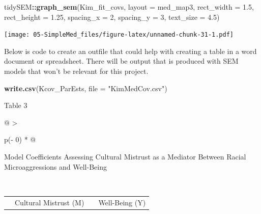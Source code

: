 \documentclass[
  11pt,
]{book}
\newenvironment{Shaded}{\begin{snugshade}}{\end{snugshade}}
\newcommand{\AttributeTok}[1]{\textcolor[rgb]{0.27,0.27,0.27}{#1}}
\newcommand{\DecValTok}[1]{\textcolor[rgb]{0.06,0.06,0.06}{#1}}
\newcommand{\FloatTok}[1]{\textcolor[rgb]{0.06,0.06,0.06}{#1}}
\newcommand{\FunctionTok}[1]{\textcolor[rgb]{0.27,0.27,0.27}{\textbf{#1}}}
\newcommand{\NormalTok}[1]{#1}
\newcommand{\SpecialCharTok}[1]{\textcolor[rgb]{0.43,0.43,0.43}{\textbf{#1}}}
\newcommand{\StringTok}[1]{\textcolor[rgb]{0.5,0.5,0.5}{#1}}
\begin{document}
\begin{Shaded}
\begin{Highlighting}[]
\NormalTok{tidySEM}\SpecialCharTok{::}\FunctionTok{graph\_sem}\NormalTok{(Kim\_fit\_covs, }\AttributeTok{layout =}\NormalTok{ med\_map3, }\AttributeTok{rect\_width =} \FloatTok{1.5}\NormalTok{, }\AttributeTok{rect\_height =} \FloatTok{1.25}\NormalTok{,}
    \AttributeTok{spacing\_x =} \DecValTok{2}\NormalTok{, }\AttributeTok{spacing\_y =} \DecValTok{3}\NormalTok{, }\AttributeTok{text\_size =} \FloatTok{4.5}\NormalTok{)}
\end{Highlighting}
\end{Shaded}

\texttt{[image: 05-SimpleMed\_files/figure-latex/unnamed-chunk-31-1.pdf]}

Below is code to create an outfile that could help with creating a table in a word document or spreadsheet. There will be output that is produced with SEM models that won't be relevant for this project.

\begin{Shaded}
\begin{Highlighting}[]
\FunctionTok{write.csv}\NormalTok{(Kcov\_ParEsts, }\AttributeTok{file =} \StringTok{"KimMedCov.csv"}\NormalTok{)}
\end{Highlighting}
\end{Shaded}

Table 3

\begin{longtable}[]{@{}
  >{\raggedright\arraybackslash}p{(\columnwidth - 0\tabcolsep) * }@{}}
\toprule\noalign{}
\begin{minipage}[b]{\linewidth}\raggedright
Model Coefficients Assessing Cultural Mistrust as a Mediator Between Racial Microaggressions and Well-Being
\end{minipage} \\
\midrule\noalign{}
\endhead
\bottomrule\noalign{}
\endlastfoot
\end{longtable}

\begin{longtable}[]{@{}
  >{\raggedright\arraybackslash}p{}
  >{\centering\arraybackslash}p{}
  >{\centering\arraybackslash}p{}
  >{\centering\arraybackslash}p{}@{}}
\toprule\noalign{}
\endhead
\bottomrule\noalign{}
\endlastfoot
& Cultural Mistrust (M) & & Well-Being (Y) \\
\end{longtable}
\end{document}
